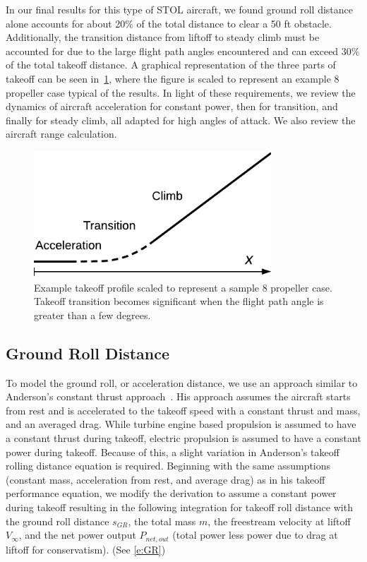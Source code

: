 \documentclass[conf]{new-aiaa}
\begin{document}
In our final results for this type of STOL aircraft, we found ground roll distance alone accounts for about 20\% of the total distance to clear a 50 ft obstacle. Additionally, the transition distance from liftoff to steady climb must be accounted for due to the large flight path angles encountered and can exceed 30\% of the total takeoff distance. A graphical representation of the three parts of takeoff can be seen in~\cref{f:takeoff}, where the figure is scaled to represent an example 8 propeller case typical of the results. In light of these requirements, we review the dynamics of aircraft acceleration for constant power, then for transition, and finally for steady climb, all adapted for high angles of attack. We also review the aircraft range calculation.


\begin{figure}[htbp]
    \centering
    \includegraphics[width=3.5in]{takeoff}
    \caption{Example takeoff profile scaled to represent a sample 8 propeller case. Takeoff transition becomes significant when the flight path angle is greater than a few degrees.}
    \label{f:takeoff}
\end{figure}

\subsection{Ground Roll Distance}

\label{GroundRollDistance}

To model the ground roll, or acceleration distance, we use an approach similar to Anderson's constant thrust approach~\cite{Anderson:2015aa}. His approach assumes the aircraft starts from rest and is accelerated to the takeoff speed with a constant thrust and mass, and an averaged drag. While turbine engine based propulsion is assumed to have a constant thrust during takeoff, electric propulsion is assumed to have a constant power during takeoff. Because of this, a slight variation in Anderson's takeoff rolling distance equation is required. Beginning with the same assumptions (constant mass, acceleration from rest, and average drag) as in his takeoff performance equation, we modify the derivation to assume a constant power during takeoff resulting in the following integration for takeoff roll distance with the ground roll distance $s_{GR}$, the total mass $m$, the freestream velocity at liftoff $V_{\infty}$, and the net power output $P_{net,out}$ (total power less power due to drag at liftoff for conservatism). (See \cref{e:GR})
\end{document}
